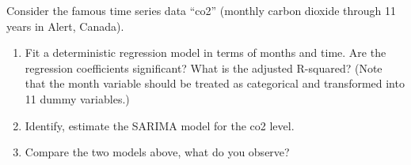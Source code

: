 \documentclass[UTF8,a4paper,14pt]{ctexart}
\theoremstyle{definition}
\theoremstyle{remark}
\begin{document}
\begin{Problem}{}

  Consider the famous time series data “co2” (monthly carbon dioxide through 11 years in Alert, Canada).
  \begin{enumerate}[label=(\alph*)]
    \item Fit a deterministic regression model in terms of months and time. Are the regression coefficients     significant? What is the adjusted R-squared? (Note that the month variable should be treated as categorical and transformed into 11 dummy variables.)
    \item Identify, estimate the SARIMA model for the co2 level.
    \item Compare the two models above, what do you observe?
    \end{enumerate}
\end{Problem}
\end{document}

